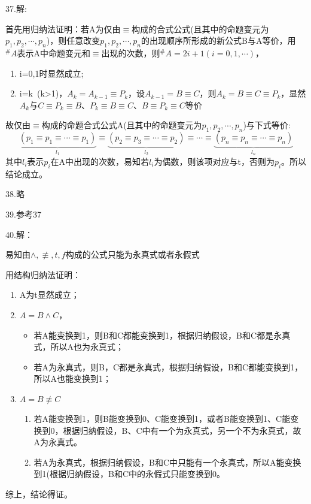 \documentclass[a4paper]{ctexart}
\begin{document}
\noindent 37.解:

首先用归纳法证明：若A为仅由$\equiv$构成的合式公式(且其中的命题变元为$p_1,p_2,\cdots,p_n$)，则任意改变$p_1,p_2,\cdots,p_n$的出现顺序所形成的新公式B与A等价，用$^\#A$表示A中命题变元和$\equiv$出现的次数，则$^\#A=2i+1(i=0,1,\cdots)$，
\begin{enumerate}
    \item i=0,1时显然成立;
    \item i=k\ (k>1)，$A_k=A_{k-1}\equiv P_k$，设$A_{k-1}=B\equiv C$，则$A_k=B\equiv C\equiv P_k$，显然$A_k$与$C\equiv P_k \equiv B$、$P_k \equiv B \equiv C$、$B \equiv P_k  \equiv C$等价
\end{enumerate}
故仅由$\equiv$构成的命题合式公式A(且其中的命题变元为$p_1,p_2,\cdots,p_n$)与下式等价:
\begin{equation*}
    \underbrace{(p_1\equiv p_1\equiv \cdots\equiv p_1)}_{l_1}\equiv\underbrace{(p_2\equiv p_3\equiv \cdots\equiv p_2)}_{l_2}\equiv\cdots\equiv\underbrace{(p_n\equiv p_n\equiv \cdots\equiv p_n)}_{l_n}
    \end{equation*}
其中$l_i$表示$p_i$在A中出现的次数，易知若$l_i$为偶数，则该项对应与t，否则为$p_i$。所以结论成立。\newline
  
\noindent 38.略

\noindent 39.参考37

\noindent 40.解：

易知由$\wedge,\not\equiv,t,f$构成的公式只能为永真式或者永假式

用结构归纳法证明：
\begin{enumerate}
  \item A为t显然成立；
  \item $A=B\wedge C$，
  \begin{itemize}
    \item 若A能变换到1，则B和C都能变换到1，根据归纳假设，B和C都是永真式，所以A也为永真式；
    \item 若A为永真式，则B，C都是永真式，根据归纳假设，B和C都能变换到1，所以A也能变换到1；
  \end{itemize}    
  \item $A=B\not\equiv C$
  \begin{enumerate}
    \item 若A能变换到1，则B能变换到0、C能变换到1，或者B能变换到1、C能变换到0，根据归纳假设，B、C中有一个为永真式，另一个不为永真式，故A为永真式。
    \item 若A为永真式，根据归纳假设，B和C中只能有一个永真式，所以A能变换到1(根据归纳假设，B和C中的永假式只能变换到0。
  \end{enumerate}
  
\end{enumerate}
综上，结论得证。\newline
\end{document}
